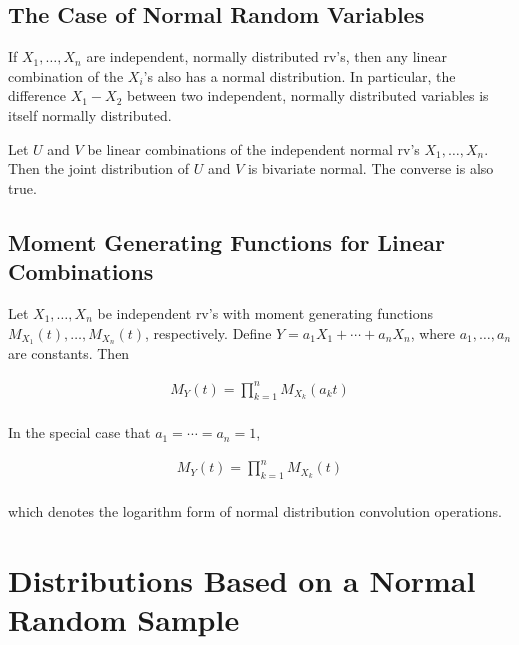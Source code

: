 \subsection{The Case of Normal Random Variables}

\begin{proposition}
    If $X_1,\dots,X_n$ are independent, normally distributed rv's, then any linear combination of the $X_i$'s also has a normal distribution. In particular, the difference $X_1 - X_2$ between two independent, normally distributed variables is itself normally distributed. 
\end{proposition}

\begin{proposition}
    Let $U$ and $V$ be linear combinations of the independent normal rv's $X_1,\dots,X_n$. Then the joint distribution of $U$ and $V$ is bivariate normal. The converse is also true. 
\end{proposition}

\subsection{Moment Generating Functions for Linear Combinations}

\begin{proposition}
    Let $X_1,\dots,X_n$ be independent rv's with moment generating functions $M_{X_1}(t),\dots,M_{X_n}(t)$, respectively. Define $Y=a_1X_1 + \cdots + a_nX_n$, where $a_1,\dots,a_n$ are constants. Then 

    \begin{align*}
        M_Y(t) = \prod_{k=1}^n M_{X_k}(a_kt) \\
    \end{align*}
    
    In the special case that $a_1=\cdots=a_n=1$, 
    
    \begin{align*}
        M_Y(t) = \prod_{k=1}^n M_{X_k}(t) \\
    \end{align*}

    which denotes the logarithm form of normal distribution convolution operations.
\end{proposition}

\section{Distributions Based on a Normal Random Sample}

